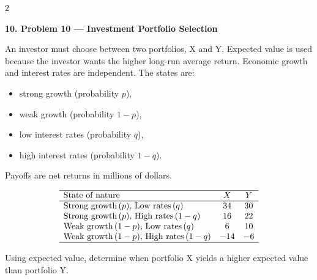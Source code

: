 \documentclass[12pt]{article}
\newcommand{\SubsectionBox}[1]{%
	\noindent\colorbox{gray!30}{%
		\parbox{\linewidth}{\textbf{#1}}%
	}\par\vspace{0.35cm}%
}
\begin{document}
\begin{multicols}{2}
		\vspace{0.25cm}
		\SubsectionBox{10. Problem 10 --- Investment Portfolio Selection}\vspace{-0.25cm}
		An investor must choose between two portfolios, X and Y. Expected value is used because the investor wants the higher long-run average return. Economic growth and interest rates are independent. The states are:
				\begin{itemize}
					\item strong growth (probability \(p\)),
					\item weak growth (probability \(1-p\)),
					\item low interest rates (probability \(q\)),
					\item high interest rates (probability \(1-q\)).
				\end{itemize}
				Payoffs are net returns in millions of dollars.
				
				\[
				\begin{array}{lcc}
					\hline
					\mbox{State of nature} & X & Y \\
					\hline
					\mbox{Strong growth}\,(p),\,\mbox{Low rates}\,(q) & 34 & 30 \\
					\mbox{Strong growth}\,(p),\,\mbox{High rates}\,(1-q) & 16 & 22 \\
					\mbox{Weak growth}\,(1-p),\,\mbox{Low rates}\,(q) & 6 & 10 \\
					\mbox{Weak growth}\,(1-p),\,\mbox{High rates}\,(1-q) & -14 & -6 \\
					\hline
				\end{array}
				\]
				
				Using expected value, determine when portfolio X yields a higher expected value than portfolio Y.

	\end{multicols}
\end{document}
